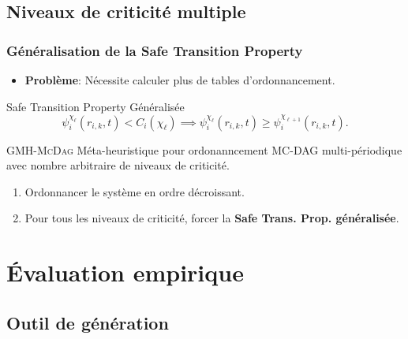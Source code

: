 \documentclass[xcolor=table]{beamer}
\begin{document}
\subsection{Niveaux de criticité multiple}

\begin{frame}
	\frametitle{Généralisation de la Safe Transition Property}
	
	\begin{itemize}
		\item \textbf{Problème}: Nécessite calculer plus de tables d'ordonnancement.
	\end{itemize}
	
	\begin{exampleblock}{Safe Transition Property Généralisée}
		\begin{equation}
		\psi_i^{\chi_\ell} (r_{i,k}, t) < C_i(\chi_\ell) \implies 
		\psi_i^{\chi_\ell}(r_{i,k}, t) \geq 
		\psi_i^{\chi_{\ell+1}}(r_{i,k},t).
		\label{eq:start_n_mode_lo}
		\end{equation}
	\end{exampleblock}
	
	\begin{exampleblock}{\textsc{GMH-McDag}}
		Méta-heuristique pour ordonanncement MC-DAG multi-périodique  avec nombre arbitraire de 
		niveaux de criticité.
		\begin{enumerate}
			\item Ordonnancer le système en ordre décroissant.
			\item Pour tous les niveaux de criticité, forcer la \textbf{Safe Trans. Prop. généralisée}.
		\end{enumerate}
	\end{exampleblock}
\end{frame}

\section{Évaluation empirique}
\subsection{Outil de génération}
\end{document}
